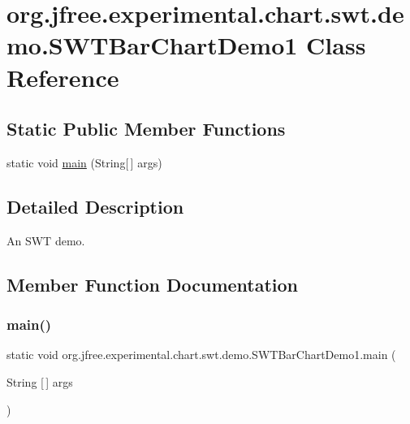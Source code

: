 \hypertarget{classorg_1_1jfree_1_1experimental_1_1chart_1_1swt_1_1demo_1_1_s_w_t_bar_chart_demo1}{}\section{org.\+jfree.\+experimental.\+chart.\+swt.\+demo.\+S\+W\+T\+Bar\+Chart\+Demo1 Class Reference}
\label{classorg_1_1jfree_1_1experimental_1_1chart_1_1swt_1_1demo_1_1_s_w_t_bar_chart_demo1}
\subsection*{Static Public Member Functions}
\begin{DoxyCompactItemize}
\item 
static void \mbox{\hyperlink{classorg_1_1jfree_1_1experimental_1_1chart_1_1swt_1_1demo_1_1_s_w_t_bar_chart_demo1_a9933d95d47dd6ab9ed48ae40d523fb5e}{main}} (String\mbox{[}$\,$\mbox{]} args)
\end{DoxyCompactItemize}


\subsection{Detailed Description}
An S\+WT demo. 

\subsection{Member Function Documentation}
\mbox{\label{classorg_1_1jfree_1_1experimental_1_1chart_1_1swt_1_1demo_1_1_s_w_t_bar_chart_demo1_a9933d95d47dd6ab9ed48ae40d523fb5e}} 
\subsubsection{\texorpdfstring{main()}{main()}}
{\footnotesize\ttfamily static void org.\+jfree.\+experimental.\+chart.\+swt.\+demo.\+S\+W\+T\+Bar\+Chart\+Demo1.\+main (\begin{DoxyParamCaption}\item[{String \mbox{[}$\,$\mbox{]}}]{args }\end{DoxyParamCaption})\hspace{0.3cm}{\ttfamily [static]}}

